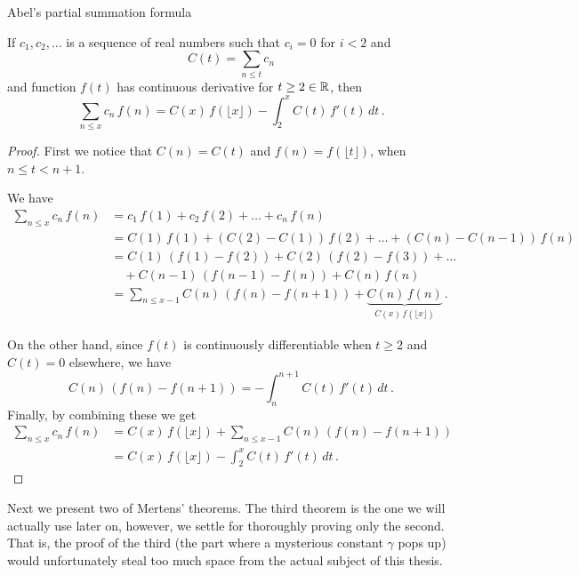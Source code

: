 \documentclass{article}
\begin{document}
\begin{lemma}
\label{lemma:abelsum}
Abel's partial summation formula

If $c_1, c_2,\dots$ is a sequence of real numbers such that $c_i=0$ for $i<2$ and
\begin{equation*}
    C(t) = \sum_{n\leq t} c_n
\end{equation*}
and function $f(t)$ has continuous derivative for $t \geq 2 \in \mathbb{R}$, then
\begin{equation*}
    \sum_{n\leq x} c_n\,f(n) = C(x)\,f(\lfloor x\rfloor)-\int_2^x C(t)\,f'(t)\,dt\,.
\end{equation*}

\clearpage

\begin{proof}
First we notice that $C(n) = C(t)$ and $f(n)=f(\lfloor t\rfloor)$, when $n\leq t < n+1$.

We have
\begin{align*}
    \sum_{n\leq x} c_n\,f(n) & = c_1\,f(1) + c_2\,f(2) + \dots + c_n\,f(n)\\
    & =  C(1)\,f(1) + (C(2)-C(1))\,f(2) + \dots + (C(n)-C(n-1))\,f(n)\\
    & = C(1)\,(f(1)-f(2)) + C(2)\,(f(2)-f(3)) + \dots\\
    & \quad + C(n-1)\,(f(n-1)-f(n)) + C(n)\,f(n)\\
    & = \sum_{n\leq x-1} C(n)\,(f(n)-f(n+1)) + \underbrace{C(n)\,f(n)}_\text{$C(x)\,f(\lfloor x\rfloor)$}\,.
\end{align*}

On the other hand, since $f(t)$ is continuously differentiable when $t\geq2$ and $C(t)=0$ elsewhere, we have
\begin{equation*}
     C(n)\,(f(n)-f(n+1)) = -\int_n^{n+1} C(t)\,f'(t)\,dt\,.
\end{equation*}
Finally, by combining these we get
\begin{align*}
    \sum_{n\leq x} c_n\,f(n) & = C(x)\,f(\lfloor x\rfloor) + \sum_{n\leq x-1} C(n)\,(f(n)-f(n+1))\\
    & = C(x)\,f(\lfloor x\rfloor)-\int_2^x C(t)\,f'(t)\,dt\,.
\end{align*}

\end{proof}
\end{lemma}

Next we present two of Mertens' theorems. The third theorem is the one we will actually use later on, however, we settle for thoroughly proving only the second. That is, the proof of the third (the part where a mysterious constant $\gamma$ pops up) would unfortunately steal too much space from the actual subject of this thesis.
\end{document}
